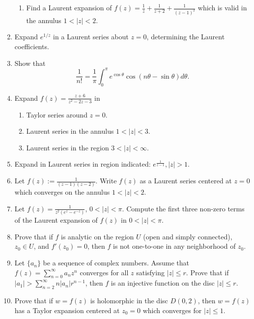 \documentclass[a4paper,10pt]{article}
\begin{document}
\begin{enumerate}
\begin{enumerate}
 		\item Find a Laurent expansion of $f(z) = \frac{1}{z} + \frac{1}{z + 2} + \frac{1}{(z - 1)^2}$ which is valid in the annulus $1 < |z| < 2$.
 	\end{enumerate}
 	
 	\item Expand $e^{1/z}$ in a Laurent series about $z = 0$, determining the Laurent coefficients.
 	
 	\item Show that 
 	\[\frac{1}{n!} = \frac{1}{\pi} \int_{0}^{\pi} e^{\cos \theta} \cos(n \theta - \sin \theta) d\theta.\]
 	
 	\item Expand $f(z) = \frac{z + 6}{z^2 - 2z - 3}$ in
 	
 	\begin{enumerate}
 		\item Taylor series around $z = 0$.
 		
 		\item Laurent series in the annulus $1 < |z| < 3$.
 		
 		\item Laurent series in the region $3 < |z| < \infty$.
 	\end{enumerate}
 	
 	\item Expand in Laurent series in region indicated: $e^{\frac{1}{z - 1}}, |z| > 1$.
 	
 	\item Let $f(z):= \frac{1}{(z - 1)(z - 2)}$. Write $f(z)$ as a Laurent series centered at $z = 0$ which converges on the annulus $1 < |z| < 2$.
 	
 	\item Let $f(z) = \frac{1}{z^2 (e^z - e^{-z})}$, $0 < |z| < \pi$. Compute the first three non-zero terms of the Laurent expansion of $f(z)$ in $0 < |z| < \pi$.
 	
 	\item Prove that if $f$ is analytic on the region $U$ (open and simply connected), $z_0 \in U$, and $f'(z_0) = 0$, then $f$ is not one-to-one in any neighborhood of $z_0$.
 	
 	\item Let $\{a_n\}$ be a sequence of complex numbers. Assume that $f(z) = \sum_{n = 0}^{\infty} a_n z^n$ converges for all $z$ satisfying $|z| \leq r$. Prove that if $|a_1| > \sum_{n = 2}^{\infty} n |a_n| r^{n - 1}$, then $f$ is an injective function on the disc $|z| \leq r$.
 	
 	\item Prove that if $w = f(z)$ is holomorphic in the disc $D(0, 2)$, then $w = f(z)$ has a Taylor expansion centered at $z_0 = 0$ which converges for $|z| \leq 1$.
 	

\end{enumerate}
\end{document}
